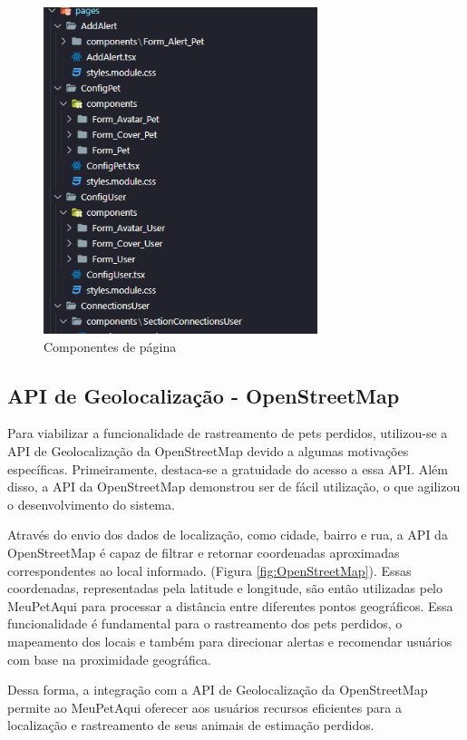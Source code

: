 \begin{itemize}
\begin{figure}[htb]
     \centering
     \includegraphics[width=8cm]{arquivos/Figuras/componentes2.png}
     \caption{Componentes de página}
         \label{fig:componentizacao2}
\end{figure}

\end{itemize}

\newpage
\subsection{API de Geolocalização - OpenStreetMap }
Para viabilizar a funcionalidade de rastreamento de pets perdidos, utilizou-se a API de Geolocalização da OpenStreetMap devido a algumas motivações específicas. Primeiramente, destaca-se a gratuidade do acesso a essa API. Além disso, a API da OpenStreetMap demonstrou ser de fácil utilização, o que agilizou o desenvolvimento do sistema.

Através do envio dos dados de localização, como cidade, bairro e rua, a API da OpenStreetMap é capaz de filtrar e retornar coordenadas aproximadas correspondentes ao local informado. (Figura \ref{fig:OpenStreetMap}). Essas coordenadas, representadas pela latitude e longitude, são então utilizadas pelo MeuPetAqui para processar a distância entre diferentes pontos geográficos. Essa funcionalidade é fundamental para o rastreamento dos pets perdidos, o mapeamento dos locais e também para direcionar alertas e recomendar usuários com base na proximidade geográfica.

Dessa forma, a integração com a API de Geolocalização da OpenStreetMap permite ao MeuPetAqui oferecer aos usuários recursos eficientes para a localização e rastreamento de seus animais de estimação perdidos.

